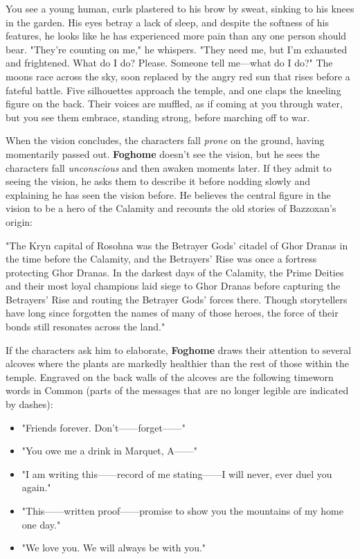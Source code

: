 \documentclass[letterpaper, 11pt, bg=full, twocolumn]{dndbook}
\begin{document}
\begin{DndReadAloud}
You see a young human, curls plastered to his brow by sweat, sinking to his knees in the garden. His eyes betray a lack of sleep, and despite the softness of his features, he looks like he has experienced more pain than any one person should bear. "They're counting on me," he whispers. "They need me, but I'm exhausted and frightened. What do I do? Please. Someone tell me---what do I do?"
The moons race across the sky, soon replaced by the angry red sun that rises before a fateful battle. Five silhouettes approach the temple, and one claps the kneeling figure on the back. Their voices are muffled, as if coming at you through water, but you see them embrace, standing strong, before marching off to war.
\end{DndReadAloud}

When the vision concludes, the characters fall \textit{prone} on the ground, having momentarily passed out. \textbf{Foghome} doesn't see the vision, but he sees the characters fall \textit{unconscious} and then awaken moments later. If they admit to seeing the vision, he asks them to describe it before nodding slowly and explaining he has seen the vision before. He believes the central figure in the vision to be a hero of the Calamity and recounts the old stories of Bazzoxan's origin:

\begin{DndReadAloud}
"The Kryn capital of Rosohna was the Betrayer Gods' citadel of Ghor Dranas in the time before the Calamity, and the Betrayers' Rise was once a fortress protecting Ghor Dranas. In the darkest days of the Calamity, the Prime Deities and their most loyal champions laid siege to Ghor Dranas before capturing the Betrayers' Rise and routing the Betrayer Gods' forces there. Though storytellers have long since forgotten the names of many of those heroes, the force of their bonds still resonates across the land."
\end{DndReadAloud}

If the characters ask him to elaborate, \textbf{Foghome} draws their attention to several alcoves where the plants are markedly healthier than the rest of those within the temple. Engraved on the back walls of the alcoves are the following timeworn words in Common (parts of the messages that are no longer legible are indicated by dashes):

\begin{itemize}
\item "Friends forever. Don't------forget------"
\item "You owe me a drink in Marquet, A------"
\item "I am writing this------record of me stating------I will never, ever duel you again."
\item "This------written proof------promise to show you the mountains of my home one day."
\item "We love you. We will always be with you."
\end{itemize}
\end{document}
